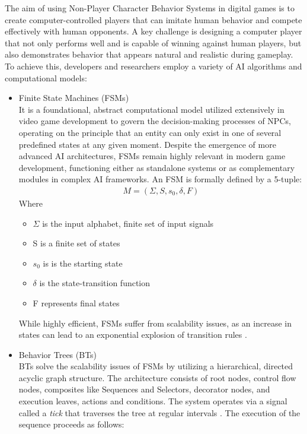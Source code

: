 The aim of using Non-Player Character Behavior Systems in digital games is to create computer-controlled players that can imitate human behavior and compete effectively with human opponents. A key challenge is designing a computer player that not only performs well and is capable of winning against human players, but also demonstrates behavior that appears natural and realistic during gameplay. To achieve this, developers and researchers employ a variety of AI algorithms and computational models:
\begin{itemize}
	\item Finite State Machines (FSMs) \\It is a foundational, abstract computational model utilized extensively in video game development to govern the decision-making processes of NPCs, operating on the principle that an entity can only exist in one of several predefined states at any given moment. Despite the emergence of more advanced AI architectures, FSMs remain highly relevant in modern game development, functioning either as standalone systems or as complementary modules in complex AI frameworks. An FSM is formally defined by a 5-tuple:
	\begin{align}
	M = (\Sigma, S, s_0, \delta, F) 
	\end{align}
	Where
	\begin{itemize}
		\item $\Sigma$ is the input alphabet, finite set of input signals
		\item S is a finite set of states
		\item $s_0$ is is the starting state
		\item $\delta$ is the state-transition function
		\item F represents final states
	\end{itemize}
	While highly efficient, FSMs suffer from scalability issues, as an increase in states can lead to an exponential explosion of transition rules \cite{uludagli2023non}.
	
	\item Behavior Trees (BTs) \\ BTs solve the scalability issues of FSMs by utilizing a hierarchical, directed acyclic graph structure. The architecture consists of root nodes, control flow nodes, composites like Sequences and Selectors, decorator nodes, and execution leaves, actions and conditions. The system operates via a signal called a \textit{tick} that traverses the tree at regular intervals \cite{uludagli2023non}. The execution of the sequence proceeds as follows:
	\begin{enumerate}
		

\end{enumerate}
\end{itemize}
